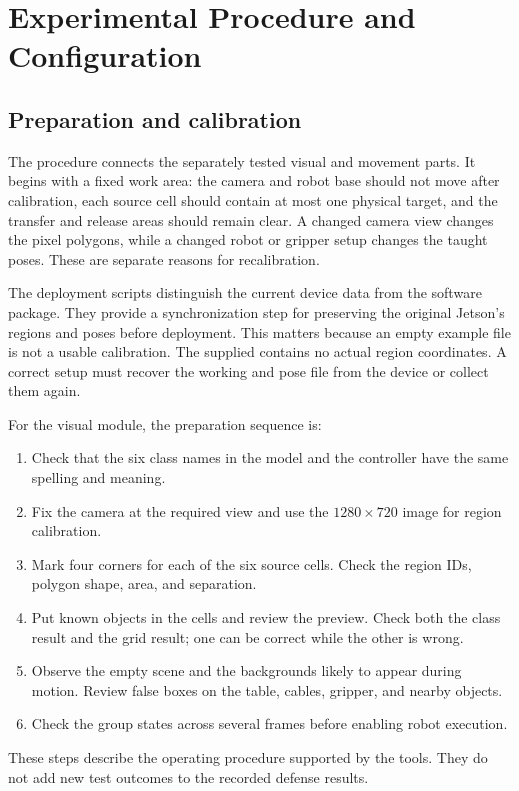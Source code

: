 \section{Experimental Procedure and Configuration}
\subsection{Preparation and calibration}
The procedure connects the separately tested visual and movement parts. It begins with a fixed work area: the camera and robot base should not move after calibration, each source cell should contain at most one physical target, and the transfer and release areas should remain clear. A changed camera view changes the pixel polygons, while a changed robot or gripper setup changes the taught poses. These are separate reasons for recalibration.

The deployment scripts distinguish the current device data from the software package. They provide a synchronization step for preserving the original Jetson's regions and poses before deployment. This matters because an empty example file is not a usable calibration. The supplied  contains no actual region coordinates. A correct setup must recover the working  and pose file from the device or collect them again.

For the visual module, the preparation sequence is:
\begin{enumerate}
\item Check that the six class names in the model and the controller have the same spelling and meaning.
\item Fix the camera at the required view and use the $1280\times720$ image for region calibration.
\item Mark four corners for each of the six source cells. Check the region IDs, polygon shape, area, and separation.
\item Put known objects in the cells and review the preview. Check both the class result and the grid result; one can be correct while the other is wrong.
\item Observe the empty scene and the backgrounds likely to appear during motion. Review false boxes on the table, cables, gripper, and nearby objects.
\item Check the group states across several frames before enabling robot execution.
\end{enumerate}

These steps describe the operating procedure supported by the tools. They do not add new test outcomes to the recorded defense results.


